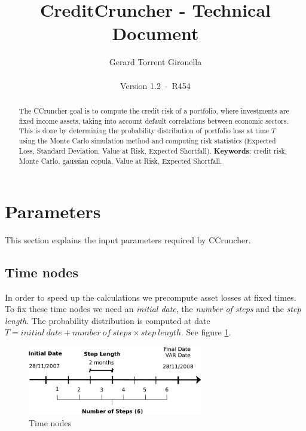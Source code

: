\documentclass[a4paper,12pt,final]{article}
\def\numversion{1.2}
\def\svnversion{R454}
\begin{document}
\title{CreditCruncher - Technical Document}
\author{Gerard Torrent Gironella\\\\Version \numversion\ -\ \svnversion}
\date{}
\maketitle


\begin{abstract}
The CCruncher goal is to compute the credit risk of a portfolio, where 
investments are fixed income assets, taking into account default correlations
between economic sectors. This is done by determining the probability distribution 
of portfolio loss at time $T$ using the Monte Carlo simulation method and computing 
risk statistics (Expected Loss, Standard Deviation, Value at Risk, Expected 
Shortfall).
\newline
\newline
\textbf{Keywords}: credit risk, Monte Carlo, gaussian copula, Value at Risk,
Expected Shortfall.
\end{abstract}


\section{Parameters}

This section explains the input parameters required by CCruncher.

\subsection{Time nodes}
In order to speed up the calculations we precompute asset losses at fixed 
times. To fix these time nodes we need an \emph{initial date}, the 
\emph{number of steps} and the \emph{step length}. The probability distribution
is computed at date $T = initial\ date + number\ of\ steps \times step\ length$.
See figure \ref{cctime1}.

\begin{figure}[!hbt]
\begin{center}
\includegraphics[height=3.0cm, angle=0]{./images/cctime1.eps}
\caption{Time nodes}
\label{cctime1}
\end{center}
\end{figure}
\FloatBarrier
\end{document}
